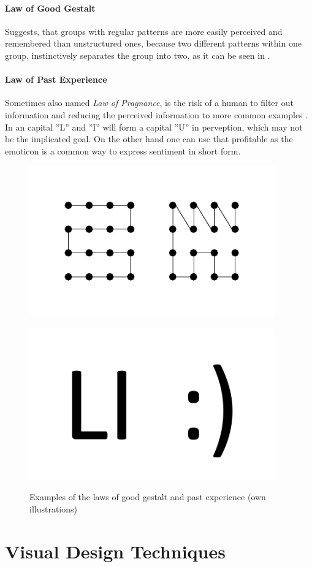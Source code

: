\paragraph*{Law of Good Gestalt} Suggests, that groups with regular patterns are more easily perceived and remembered than unstructured ones, because two different patterns within one group, instinctively separates the group into two, as it can be seen in  \parencite{Todorovic.2008}.
\paragraph*{Law of Past Experience} Sometimes also named \textit{Law of Pragnance}, is the risk of a human to filter out information and reducing the perceived information to more common examples \parencite{Stevenson.n.y.}. In  an capital ''L'' and ''I'' will form a capital ''U'' in perveption, which may not be the implicated goal. On the other hand one can use that profitable as the emoticon is a common way to express sentiment in short form.
\begin{figure}[H] 
    \begin{minipage}[b]{.5\linewidth}
        \centering\includegraphics[width=0.94\textwidth]{img/gestalt.pdf}
        \label{fig:gest}
    \end{minipage}%
    \begin{minipage}[b]{.5\linewidth}
        \centering\includegraphics[width=0.94\textwidth]{img/experience.pdf}
        \label{fig:exo}
    \end{minipage}
    \caption[Laws of Good Gestalt and Past Experience]{Examples of the laws of good gestalt and past experience (own illustrations)}\label{fig:law4}
\end{figure}
\section{Visual Design Techniques}
